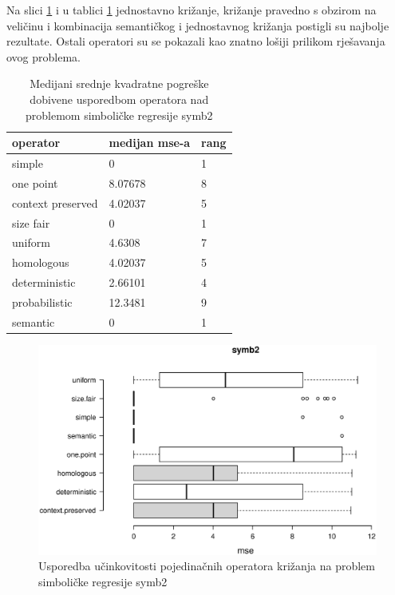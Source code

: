 Na slici \ref{symb2box} i u tablici \ref{symb2table} jednostavno križanje, križanje pravedno s obzirom na veličinu i kombinacija semantičkog i jednostavnog križanja postigli su najbolje rezultate. Ostali operatori su se pokazali kao znatno lošiji prilikom rješavanja ovog problema.

\begin{table}[H]
 	\centering
 \caption{Medijani srednje kvadratne pogreške dobivene usporedbom operatora nad problemom simboličke regresije symb2}
    \begin{tabular}{| l | l | l |}
    \hline
    \textbf{operator} & \textbf{medijan mse-a}  & \textbf{rang}\\ \hline
    simple & 0 & 1\\ \hline
    one point & 8.07678 & 8\\ \hline
    context preserved & 4.02037 & 5\\ \hline
    size fair & 0 & 1\\ \hline
    uniform & 4.6308 & 7\\ \hline
    homologous & 4.02037 & 5\\ \hline
    deterministic &2.66101 & 4\\ \hline
    probabilistic & 12.3481 & 9\\ \hline
    semantic & 0 & 1\\ \hline
    \end{tabular}
    
   
    \label{symb2table}
\end{table}

\begin{figure}[H]
	\centering
	\includegraphics[trim=0cm 4cm 0cm 0cm, scale=0.6]{./slike/boxPlots/symb2.eps}
	\caption{Usporedba učinkovitosti pojedinačnih operatora križanja na problem simboličke regresije symb2}
	\label{symb2box}
\end{figure}


